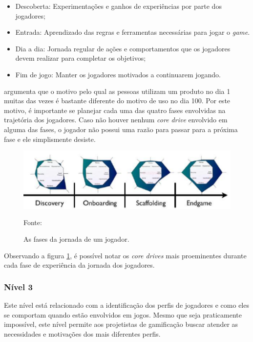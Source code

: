 \begin{itemize}
	\item Descoberta: Experimentações e ganhos de experiências por parte dos jogadores;
	\item Entrada: Aprendizado das regras e ferramentas necessárias para jogar o \textit{game}.
	\item Dia a dia: Jornada regular de ações e comportamentos que os jogadores devem realizar para completar os objetivos;
	\item Fim de jogo: Manter os jogadores motivados a continuarem jogando.
	
\end{itemize}

 argumenta que o motivo pelo qual as pessoas utilizam um produto no dia 1 muitas das vezes é bastante diferente do
motivo de uso no dia 100. Por este motivo, é importante se planejar cada uma das quatro fases envolvidas na trajetória dos jogadores. Caso não houver nenhum
\textit{core drive} envolvido em alguma das fases, o jogador não possui uma razão para passar para a próxima fase e ele simplismente desiste.

\begin{figure}[h]
	\centering
	\includegraphics[keepaspectratio=true,scale=0.48]{figuras/fasesjornada.png}
	\caption{As fases da jornada de um jogador.}
	Fonte: \cite{chou2017actionable}
	\label{fasesjornada}
\end{figure}

Observando a figura \ref{fasesjornada}, é possível notar os \textit{core drives} mais proeminentes durante cada fase de experiência da jornada
dos jogadores.

\subsubsection{Nível 3}
Este nível está relacionado com a identificação dos perfis de jogadores e como eles se comportam quando estão envolvidos em jogos. Mesmo que seja
praticamente impossível, este nível permite aos projetistas de gamificação buscar atender as necessidades e motivações dos mais diferentes perfis.

